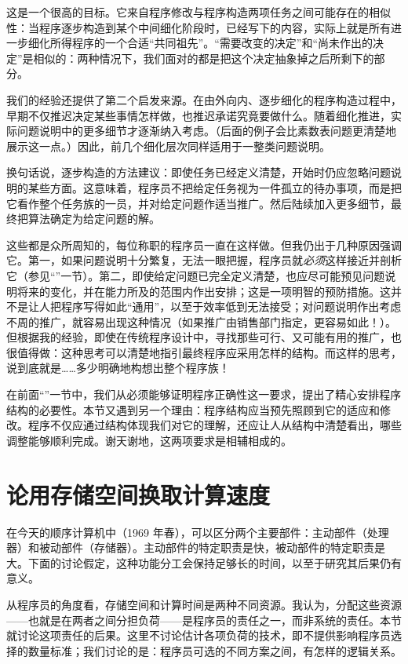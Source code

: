 这是一个很高的目标。它来自程序修改与程序构造两项任务之间可能存在的相似性：当程序逐步构造到某个中间细化阶段时，已经写下的内容，实际上就是所有进一步细化所得程序的一个合适“共同祖先”。“需要改变的决定”和“尚未作出的决定”是相似的：两种情况下，我们面对的都是把这个决定抽象掉之后所剩下的部分。

我们的经验还提供了第二个启发来源。在由外向内、逐步细化的程序构造过程中，早期不仅推迟决定某些事情怎样做，也推迟承诺究竟要做什么。随着细化推进，实际问题说明中的更多细节才逐渐纳入考虑。（后面的例子会比素数表问题更清楚地展示这一点。）因此，前几个细化层次同样适用于一整类问题说明。

换句话说，逐步构造的方法建议：即使任务已经定义清楚，开始时仍应忽略问题说明的某些方面。这意味着，程序员不把给定任务视为一件孤立的待办事项，而是把它看作整个任务族的一员，并对给定问题作适当推广。然后陆续加入更多细节，最终把算法确定为给定问题的解。

这些都是众所周知的，每位称职的程序员一直在这样做。但我仍出于几种原因强调它。第一，如果问题说明十分繁复，无法一眼把握，程序员就\textit{必须}这样接近并剖析它（参见“”一节）。第二，即使给定问题已完全定义清楚，也应尽可能预见问题说明将来的变化，并在能力所及的范围内作出安排；这是一项明智的预防措施。这并不是让人把程序写得如此“通用”，以至于效率低到无法接受；对问题说明作出考虑不周的推广，就容易出现这种情况（如果推广由销售部门指定，更容易如此！）。但根据我的经验，即使在传统程序设计中，寻找那些可行、又可能有用的推广，也很值得做：这种思考可以清楚地指引最终程序应采用怎样的结构。而这样的思考，说到底就是……多少明确地构想出整个程序族！

在前面“”一节中，我们从必须能够证明程序正确性这一要求，提出了精心安排程序结构的必要性。本节又遇到另一个理由：程序结构应当预先照顾到它的适应和修改。程序不仅应通过结构体现我们对它的理解，还应让人从结构中清楚看出，哪些调整能够顺利完成。谢天谢地，这两项要求是相辅相成的。

\section[论用存储空间换取计算速度]{论用存储空间换取计算速度}
\label{sec:trading-storage-for-computation-speed}

在今天的顺序计算机中（1969 年春），可以区分两个主要部件：主动部件（处理器）和被动部件（存储器）。主动部件的特定职责是快，被动部件的特定职责是大。下面的讨论假定，这种功能分工会保持足够长的时间，以至于研究其后果仍有意义。

从程序员的角度看，存储空间和计算时间是两种不同资源。我认为，分配这些资源——也就是在两者之间分担负荷——是程序员的责任之一，而非系统的责任。本节就讨论这项责任的后果。这里不讨论估计各项负荷的技术，即不提供影响程序员选择的数量标准；我们讨论的是：程序员可选的不同方案之间，有怎样的逻辑关系。

